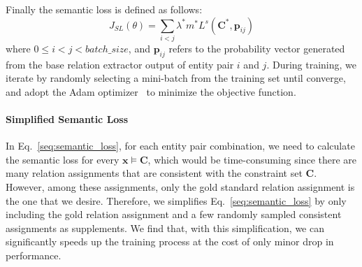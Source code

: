 Finally the semantic loss is defined as follows:
\begin{equation}
	J_{SL}(\theta) = \sum\limits_{i < j}{\lambda ^{*}m^{*}L^{s}(\bm{C}^{*}, \bm{p}_{ij})}
\end{equation}
where $0\leq i < j < batch\_size$, and $\bm{p}_{ij} $ refers to the probability vector generated from the base relation extractor output of entity pair $i$ and $j$.
During training, we iterate by randomly selecting a mini-batch from the training set until converge, and adopt the Adam optimizer~\cite{kingma2014adam} to minimize the objective function.
\paragraph{Simplified Semantic Loss}
In Eq.~\ref{seq:semantic_loss}, for each entity pair combination, we need to calculate the semantic loss for every $\bm x \models \bm{C}$, which would be time-consuming since there are many relation assignments that are consistent with the constraint set $\bm{C}$.
However, among these assignments, only the gold standard relation assignment is the one that we desire.
Therefore, we simplifies Eq.~\ref{seq:semantic_loss} by only including the gold relation assignment and a few randomly sampled consistent assignments as supplements.
We find that, with this simplification, we can significantly speeds up the training process at the cost of only minor drop in performance.





